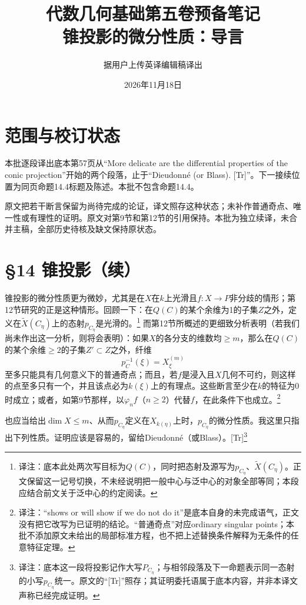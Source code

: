 \documentclass[openany,fontset=fandol]{ctexbook}
\newcommand{\note}[1]{\footnote{译注：#1}}
\begin{document}
\title{代数几何基础第五卷预备笔记\\锥投影的微分性质：导言}
\author{据用户上传英译编辑稿译出}
\date{2026年11月18日}
\maketitle
\chapter*{范围与校订状态}
本批逐段译出底本第57页从“More delicate are the differential properties of the conic projection”开始的两个段落，止于“Dieudonné (or Blass). [Tr]”。下一接续位置为同页命题14.4标题及陈述。本批不包含命题14.4。

原文把若干断言保留为尚待完成的论证，译文照存这种状态；未补作普通奇点、唯一性或有理性的证明。原文对第9节和第12节的引用保持。本批为独立续译，未合并主稿，全部历史待核及缺文保持原状态。
\chapter*{§14 锥投影（续）}
锥投影的微分性质更为微妙，尤其是在$X$在$k$上光滑且$f:X\to P$非分歧的情形；第12节研究的正是这种情形。回顾一下：在$Q(C)$的某个余维为1的子集$Z$之外，定义在$\widetilde X(C_\eta)$上的态射$p_{C_\eta}$是光滑的。\note{底本此处两次写目标为$Q(C)$，同时把态射及源写为$p_{C_\eta}$、$\widetilde X(C_\eta)$。正文保留这一记号切换，不未经说明把一般中心与泛中心的对象全部等同；本段应结合前文关于泛中心的约定阅读。}
而第12节所概述的更细致分析表明（若我们尚未作出这一分析，则将会表明）：如果$X$的各分支的维数均$\geq m$，那么在$Q(C)$的某个余维$\geq2$的子集$Z'\subset Z$之外，纤维
\[
p_C^{-1}(\xi)=X^{(m)}_\xi
\]
至多只能具有几何意义下的普通奇点；而且，若$f$是浸入且$X$几何不可约，则这样的点至多只有一个，并且该点必为$k(\xi)$上的有理点。这些断言至少在$k$的特征为0时成立；或者，如第9节那样，以$\varphi_n f$（$n\geq2$）代替$f$，在此条件下也成立。\note{“shows or will show if we do not do it”是底本自身的未完成语气，正文没有把它改写为已证明的结论。“普通奇点”对应ordinary singular points；本批不添加原文未给出的局部标准方程，也不把上述替换条件解释为无条件的任意特征定理。}

也应当给出$\dim X\leq m$、从而$p_{C_\eta}$定义在$X_{k(\eta)}$上时，$p_{C_\eta}$的微分性质。我这里只指出下列性质。证明应该是容易的，留给Dieudonné（或Blass）。[Tr]\note{底本这一段将投影记作大写$P_{C_\eta}$；与相邻段落及下一命题表示同一态射的小写$p_{C_\eta}$统一。原文的“[Tr]”照存；其证明委托语属于底本内容，并非本译文声称已经完成证明。}
\end{document}
